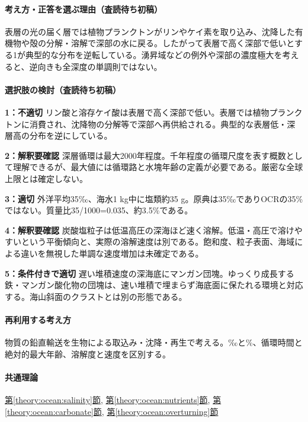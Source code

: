 \paragraph{考え方・正答を選ぶ理由（査読待ち初稿）} 表層の光の届く層では植物プランクトンがリンやケイ素を取り込み、沈降した有機物や殻の分解・溶解で深部の水に戻る。したがって表層で高く深部で低いとする1が典型的な分布を逆転している。湧昇域などの例外や深部の濃度極大を考えると、逆向きも全深度の単調則ではない。

\paragraph{選択肢の検討（査読待ち初稿）}\mbox{}\par

\noindent\textbf{1：不適切} リン酸と溶存ケイ酸は表層で高く深部で低い。表層では植物プランクトンに消費され、沈降物の分解等で深部へ再供給される。典型的な表層低・深層高の分布を逆にしている。\par

\noindent\textbf{2：解釈要確認} 深層循環は最大2000年程度。千年程度の循環尺度を表す概数として理解できるが、最大値には循環路と水塊年齢の定義が必要である。厳密な全球上限とは確定しない。\par

\noindent\textbf{3：適切} 外洋平均35‰、海水1 kg中に塩類約35 g。原典は35‰でありOCRの35\%ではない。質量比35/1000=\allowbreak{}0.035、約3.5\%である。\par

\noindent\textbf{4：解釈要確認} 炭酸塩粒子は低温高圧の深海ほど速く溶解。低温・高圧で溶けやすいという平衡傾向と、実際の溶解速度は別である。飽和度、粒子表面、海域による違いを無視した単調な速度増加は未確定である。\par

\noindent\textbf{5：条件付きで適切} 遅い堆積速度の深海底にマンガン団塊。ゆっくり成長する鉄・マンガン酸化物の団塊は、速い堆積で埋まらず海底面に保たれる環境と対応する。海山斜面のクラストとは別の形態である。\par

\paragraph{再利用する考え方} 物質の鉛直輸送を生物による取込み・沈降・再生で考える。‰と\%、循環時間と絶対的最大年齢、溶解度と速度を区別する。

\paragraph{共通理論} \hyperref[theory:ocean:salinity]{第\ref*{theory:ocean:salinity}節}, \hyperref[theory:ocean:nutrients]{第\ref*{theory:ocean:nutrients}節}, \hyperref[theory:ocean:carbonate]{第\ref*{theory:ocean:carbonate}節}, \hyperref[theory:ocean:overturning]{第\ref*{theory:ocean:overturning}節}

